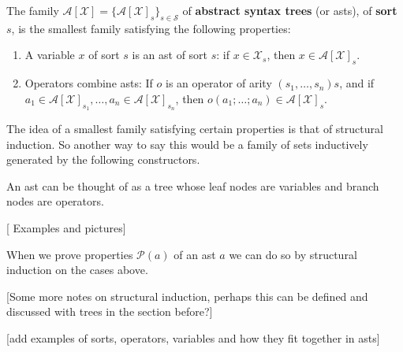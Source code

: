 \begin{defin}
    The family $\mathcal{A}[\mathcal{X}]=\{ \mathcal{A}[\mathcal{X}]_s \}_{s \in \mathcal{S}}$ of \textbf{abstract syntax trees} (or asts), of \textbf{sort} $s$, is the smallest family satisfying the following properties:
    
    \begin{enumerate}
        \item A variable $x$ of sort $s$ is an ast of sort $s$: if $x \in \mathcal{X}_s$, then $x \in \mathcal{A}[\mathcal{X}]_s$.
        
        \item Operators combine asts: If $o$ is an operator of arity $(s_1, \dots, s_n)s$, and if $a_1 \in \mathcal{A}[\mathcal{X}]_{s_1}, \dots, a_n \in \mathcal{A}[\mathcal{X}]_{s_n}$, then $o(a_1;\dots; a_n) \in \mathcal{A}[\mathcal{X}]_s$.
    \end{enumerate}
\end{defin}

\begin{remark}
    The idea of a smallest family satisfying certain properties is that of structural induction. So another way to say this would be a family of sets inductively generated by the following constructors.
\end{remark}

\begin{remark}
    An ast can be thought of as a tree whose leaf nodes are variables and branch nodes are operators. 
\end{remark}

[ Examples and pictures]


\begin{remark}
    When we prove properties $\mathcal{P}(a)$ of an ast $a$ we can do so by structural induction on the cases above.
\end{remark}

[Some more notes on structural induction, perhaps this can be defined and discussed with trees in the section before?]

[add examples of sorts, operators, variables and how they fit together in asts]


